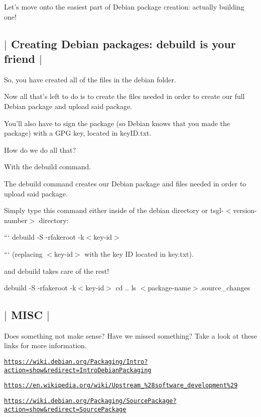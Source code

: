 Let's move onto the easiest part of Debian package creation\-: actually building one! 

 \subsection*{$\vert$ Creating Debian packages\-: {\ttfamily debuild} is your friend $\vert$ }

So, you have created all of the files in the debian folder.

Now all that's left to do is to create the files needed in order to create our full Debian package and upload said package.

You'll also have to sign the package (so Debian knows that you made the package) with a G\-P\-G key, located in key\-I\-D.\-txt.

How do we do all that?

With the {\ttfamily debuild} command.

The {\ttfamily debuild} command creates our Debian package and files needed in order to upload said package.

Simply type this command either inside of the {\ttfamily debian} directory or {\ttfamily tsgl-\/$<$version-\/number$>$} directory\-:

``` debuild -\/\-S -\/rfakeroot -\/k$<$key-\/id$>$

``` (replacing $<$key-\/id$>$ with the key I\-D located in key.\-txt).

and debuild takes care of the rest!

debuild -\/\-S -\/rfakeroot -\/k$<$key-\/id$>$ cd .. ls $<$package-\/name$>$.source\-\_\-changes 

 \subsection*{$\vert$ M\-I\-S\-C $\vert$ }

Does something not make sense? Have we missed something? Take a look at these links for more information.

\href{https://wiki.debian.org/Packaging/Intro?action=show&redirect=IntroDebianPackaging}{\tt https\-://wiki.\-debian.\-org/\-Packaging/\-Intro?action=show\&redirect=\-Intro\-Debian\-Packaging}

\href{https://en.wikipedia.org/wiki/Upstream_%28software_development%29}{\tt https\-://en.\-wikipedia.\-org/wiki/\-Upstream\-\_\-\%28software\-\_\-development\%29}

\href{https://wiki.debian.org/Packaging/SourcePackage?action=show&redirect=SourcePackage}{\tt https\-://wiki.\-debian.\-org/\-Packaging/\-Source\-Package?action=show\&redirect=\-Source\-Package}

